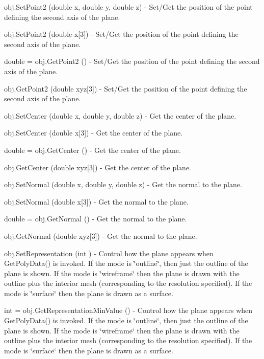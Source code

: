 \begin{DoxyItemize}
\item {\ttfamily obj.\-Set\-Point2 (double x, double y, double z)} -\/ Set/\-Get the position of the point defining the second axis of the plane.  
\item {\ttfamily obj.\-Set\-Point2 (double x\mbox{[}3\mbox{]})} -\/ Set/\-Get the position of the point defining the second axis of the plane.  
\item {\ttfamily double = obj.\-Get\-Point2 ()} -\/ Set/\-Get the position of the point defining the second axis of the plane.  
\item {\ttfamily obj.\-Get\-Point2 (double xyz\mbox{[}3\mbox{]})} -\/ Set/\-Get the position of the point defining the second axis of the plane.  
\item {\ttfamily obj.\-Set\-Center (double x, double y, double z)} -\/ Get the center of the plane.  
\item {\ttfamily obj.\-Set\-Center (double x\mbox{[}3\mbox{]})} -\/ Get the center of the plane.  
\item {\ttfamily double = obj.\-Get\-Center ()} -\/ Get the center of the plane.  
\item {\ttfamily obj.\-Get\-Center (double xyz\mbox{[}3\mbox{]})} -\/ Get the center of the plane.  
\item {\ttfamily obj.\-Set\-Normal (double x, double y, double z)} -\/ Get the normal to the plane.  
\item {\ttfamily obj.\-Set\-Normal (double x\mbox{[}3\mbox{]})} -\/ Get the normal to the plane.  
\item {\ttfamily double = obj.\-Get\-Normal ()} -\/ Get the normal to the plane.  
\item {\ttfamily obj.\-Get\-Normal (double xyz\mbox{[}3\mbox{]})} -\/ Get the normal to the plane.  
\item {\ttfamily obj.\-Set\-Representation (int )} -\/ Control how the plane appears when Get\-Poly\-Data() is invoked. If the mode is \char`\"{}outline\char`\"{}, then just the outline of the plane is shown. If the mode is \char`\"{}wireframe\char`\"{} then the plane is drawn with the outline plus the interior mesh (corresponding to the resolution specified). If the mode is \char`\"{}surface\char`\"{} then the plane is drawn as a surface.  
\item {\ttfamily int = obj.\-Get\-Representation\-Min\-Value ()} -\/ Control how the plane appears when Get\-Poly\-Data() is invoked. If the mode is \char`\"{}outline\char`\"{}, then just the outline of the plane is shown. If the mode is \char`\"{}wireframe\char`\"{} then the plane is drawn with the outline plus the interior mesh (corresponding to the resolution specified). If the mode is \char`\"{}surface\char`\"{} then the plane is drawn as a surface.  

\end{DoxyItemize}
